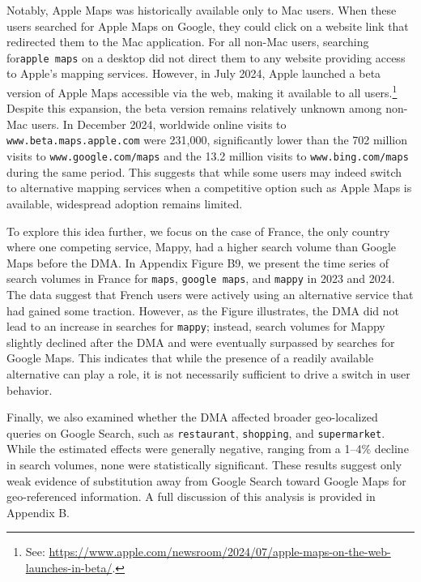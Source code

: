 \documentclass[11pt]{article}
\begin{document}
	Notably, Apple Maps was historically available only to Mac users. When these users searched for Apple Maps on Google, they could click on a website link that redirected them to the Mac application. For all non-Mac users, searching for\texttt{apple maps} on a desktop did not direct them to any website providing access to Apple’s mapping services. However, in July 2024, Apple launched a beta version of Apple Maps accessible via the web, making it available to all users.\footnote{See: \url{https://www.apple.com/newsroom/2024/07/apple-maps-on-the-web-launches-in-beta/}.} Despite this expansion, the beta version remains relatively unknown among non-Mac users. In December 2024, worldwide online visits to \texttt{www.beta.maps.apple.com} were 231,000, significantly lower than the 702 million visits to \texttt{www.google.com/maps} and the 13.2 million visits to \texttt{www.bing.com/maps} during the same period. This suggests that while some users may indeed switch to alternative mapping services when a competitive option such as Apple Maps is available, widespread adoption remains limited. 
	
	To explore this idea further, we focus on the case of France, the only country where one competing service, Mappy, had a higher search volume than Google Maps before the DMA. In Appendix Figure B9, we present the time series of search volumes in France for \texttt{maps}, \texttt{google maps}, and \texttt{mappy} in 2023 and 2024. The data suggest that French users were actively using an alternative service that had gained some traction. However, as the Figure illustrates, the DMA did not lead to an increase in searches for \texttt{mappy}; instead, search volumes for Mappy slightly declined after the DMA and were eventually surpassed by searches for Google Maps. This indicates that while the presence of a readily available alternative can play a role, it is not necessarily sufficient to drive a switch in user behavior.
	
	Finally, we also examined whether the DMA affected broader geo-localized queries on Google Search, such as \texttt{restaurant}, \texttt{shopping}, and \texttt{supermarket}. While the estimated effects were generally negative, ranging from a 1–4\% decline in search volumes, none were statistically significant. These results suggest only weak evidence of substitution away from Google Search toward Google Maps for geo-referenced information. A full discussion of this analysis is provided in Appendix B.
	
	
	
\end{document}
